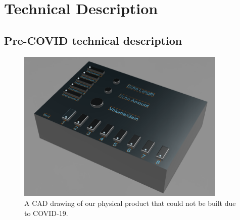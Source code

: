\documentclass[11pt]{article}
\begin{document}
\section{Technical Description}
\label{sec:org473b58b}
\subsection{Pre-COVID technical description}
\label{sec:orgfca4953}
\begin{figure}[H]
\centering
\includegraphics[width=10cm]{./side profile.png}
\caption{\label{fig:orgc511e8e}
A CAD drawing of our physical product that could not be built due to COVID-19.}
\end{figure}
\end{document}
